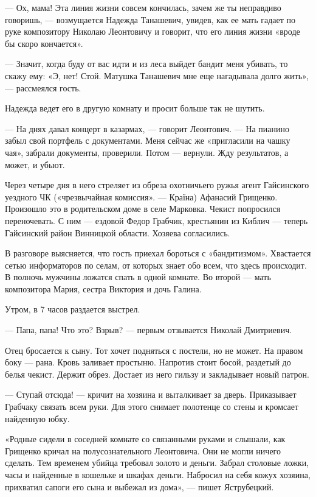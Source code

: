 — Ох, мама! Эта линия жизни совсем кончилась, зачем же ты неправдиво говоришь,
— возмущается Надежда Танашевич, увидев, как ее мать гадает по руке композитору
Николаю Леонтовичу и говорит, что его линия жизни «вроде бы скоро кончается».

— Значит, когда буду от вас идти и из леса выйдет бандит меня убивать, то скажу
ему: «Э, нет! Стой. Матушка Танашевич мне еще нагадывала долго жить», —
рассмеялся гость.

Надежда ведет его в другую комнату и просит больше так не шутить.

— На днях давал концерт в казармах, — говорит Леонтович. — На пианино забыл
свой портфель с документами. Меня сейчас же «пригласили на чашку чая», забрали
документы, проверили. Потом — вернули. Жду результатов, а может, и убьют.

Через четыре дня в него стреляет из обреза охотничьего ружья агент Гайсинского
уездного ЧК («чрезвычайная комиссия». — Країна) Афанасий Грищенко. Произошло
это в родительском доме в селе Марковка. Чекист попросился переночевать. С ним
— ездовой Федор Грабчик, крестьянин из Киблич — теперь Гайсинский район
Винницкой области. Хозяева согласились.

В разговоре выясняется, что гость приехал бороться с «бандитизмом». Хвастается
сетью информаторов по селам, от которых знает обо всем, что здесь происходит. В
полночь мужчины ложатся спать в одной комнате. Во второй — мать композитора
Мария, сестра Виктория и дочь Галина.

Утром, в 7 часов раздается выстрел.

— Папа, папа! Что это? Взрыв? — первым отзывается Николай Дмитриевич.

Отец бросается к сыну. Тот хочет подняться с постели, но не может. На правом
боку — рана. Кровь заливает простыню. Напротив стоит босой, раздетый до белья
чекист. Держит обрез. Достает из него гильзу и закладывает новый патрон.

— Ступай отсюда! — кричит на хозяина и выталкивает за дверь. Приказывает
Грабчаку связать всем руки. Для этого снимает полотенце со стены и кромсает
найденную юбку.

«Родные сидели в соседней комнате со связанными руками и слышали, как Грищенко
кричал на полусознательного Леонтовича. Они не могли ничего сделать. Тем
временем убийца требовал золото и деньги. Забрал столовые ложки, часы и
найденные в кошельке и шкафах деньги. Набросил на себя кожух хозяина, прихватил
сапоги его сына и выбежал из дома», — пишет Яструбецкий.


